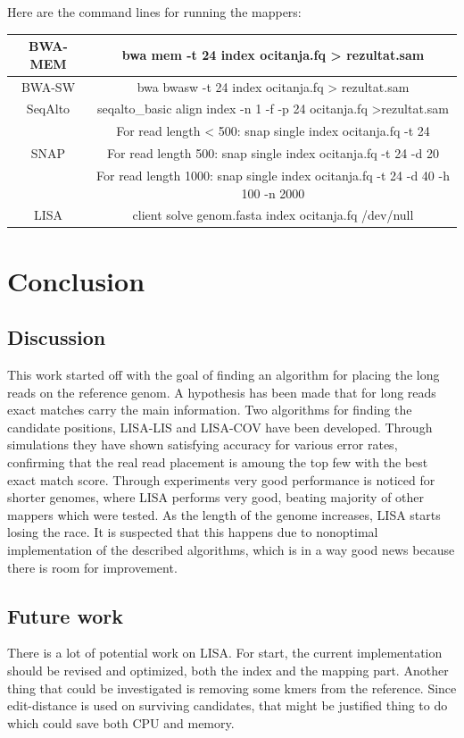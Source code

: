 \documentclass[times, utf8, diplomski]{fer}
\begin{document}
Here are the command lines for running the mappers:
\begin{table}[H]
\centering
\begin{tabular}{|c|c|}
\hline
BWA-MEM & bwa mem -t 24 index ocitanja.fq > rezultat.sam\\
\hline
BWA-SW & bwa bwasw -t 24 index ocitanja.fq > rezultat.sam\\
\hline
SeqAlto & seqalto\_basic align index -n 1 -f -p 24 ocitanja.fq >rezultat.sam\\
\hline
 & For read length < 500: snap single index ocitanja.fq -t 24\\
SNAP & For read length 500: snap single index ocitanja.fq -t 24 -d 20\\
& For read length 1000: snap single index ocitanja.fq -t 24 -d 40 -h 100 -n 2000\\
\hline
LISA & client solve genom.fasta index ocitanja.fq /dev/null\\
\hline
\end{tabular}
\label{komande}
\end{table}


\chapter{Conclusion}
\section {Discussion}
This work started off with the goal of finding an algorithm for placing the long reads on the reference genom. A hypothesis has been made that for long reads exact matches carry the main information. Two algorithms for finding the candidate positions, LISA-LIS and LISA-COV have been developed. Through simulations they have shown satisfying accuracy for various error rates, confirming that the real read placement is amoung the top few with the best exact match score. Through experiments very good performance is noticed for shorter genomes, where LISA performs very good, beating majority of other mappers which were tested. As the length of the genome increases, LISA starts losing the race. It is suspected that this happens due to nonoptimal implementation of the described algorithms, which is in a way good news because there is room for improvement.

\section {Future work}
There is a lot of potential work on LISA. For start, the current implementation should be revised and optimized, both the index and the mapping part. Another thing that could be investigated is removing some kmers from the reference. Since edit-distance is used on surviving candidates, that might be justified thing to do which could save both CPU and memory.
\end{document}
